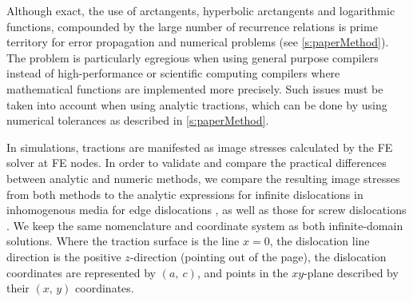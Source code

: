 Although exact, the use of arctangents, hyperbolic arctangents and logarithmic functions, compounded by the large number of recurrence relations is prime territory for error propagation and numerical problems (see \cref{s:paperMethod}). The problem is particularly egregious when using general purpose compilers instead of high-performance or scientific computing compilers where mathematical functions are implemented more precisely. Such issues must be taken into account when using analytic tractions, which can be done by using numerical tolerances as described in \cref{s:paperMethod}.

In simulations, tractions are manifested as image stresses calculated by the FE solver at FE nodes. In order to validate and compare the practical differences between analytic and numeric methods, we compare the resulting image stresses from both methods to the analytic expressions for infinite dislocations in inhomogenous media for edge dislocations \cite{head1953edge}, as well as those for screw dislocations \cite[p.~59,~64]{hirth1983theory}. We keep the same nomenclature and coordinate system as both infinite-domain solutions. Where the traction surface is the line $x=0$, the dislocation line direction is the positive $z$-direction (pointing out of the page), the dislocation coordinates are represented by $(a,~c)$, and points in the $xy$-plane described by their $(x,\,y)$ coordinates.

